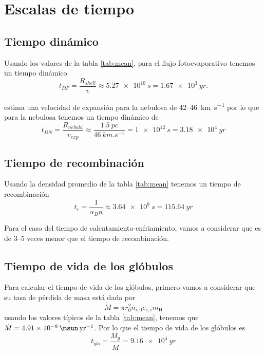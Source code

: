 \documentclass{book}
\begin{document}
\chapter{Escalas de tiempo}

\section{Tiempo dinámico}

Usando los valores de la tabla \ref{tab:mean}, para el flujo fotoevaporativo tenemos un tiempo dinámico 
\begin{equation}
t_{DF} = \frac{R_{shell}}{v} \approx \SI{5.27e10}{s}  = \SI{1.67e3}{yr}.
\end{equation}

\cite{Mancherko:2010} estima una velocidad de expansión para la nebulosa de 42--\SI{46}{km.s^{-1}} por lo que para la nebulosa tenemos un tiempo dinámico de 
\begin{equation}
t_{DN}= \frac{R_{nebula}}{v_{exp}}\approx\frac{\SI{1.5}{pc}}{\SI{46}{km.s^{-1}}}= \SI{1e12}{s}=\SI{3.18e4}{yr}
\end{equation}

\section{Tiempo de recombinación}

Usando la densidad promedio de la tabla \ref{tab:mean} tenemos un tiempo de recombinación 
\begin{equation}
t_r = \frac{1}{\alpha_B n} \approx \SI{3.64e9}{s}= \SI{115.64}{yr}
\end{equation}

Para el caso del tiempo de calentamiento-enfriamiento, vamos a considerar que es de 3--5 veces menor que el tiempo de recombinación.

\section{Tiempo de vida de los glóbulos}

Para calcular el tiempo de vida de los glóbulos, primero vamos a considerar que su tasa de pérdida de masa está dada por 
\begin{equation}
    \dot{M} =\pi r_0^2n_{i,0}c_{s,i}m_\mathrm{H}
\end{equation}
usando los valores típicos de la tabla \ref{tab:mean}, tenemos que $\dot{M} = \SI{4.91e-8}{\msun.yr^{-1}}$. Por lo que el tiempo de vida de los glóbulos es
\begin{equation}
    t_{glo}=\frac{M_g}{\dot{M}}=\SI{9.16e4}{yr}
\end{equation}
\end{document}
